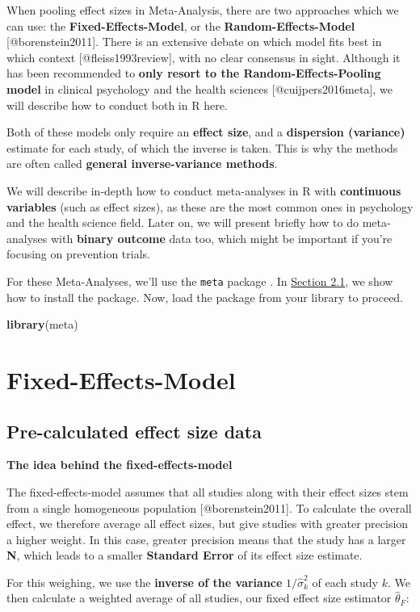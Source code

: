 \documentclass[]{book}
\newenvironment{Shaded}{\begin{snugshade}}{\end{snugshade}}
\newcommand{\KeywordTok}[1]{\textcolor[rgb]{0.13,0.29,0.53}{\textbf{#1}}}
\newcommand{\NormalTok}[1]{#1}
\theoremstyle{definition}
\theoremstyle{definition}
\theoremstyle{definition}
\theoremstyle{remark}
\begin{document}
\begin{rmdinfo}
When pooling effect sizes in Meta-Analysis, there are two approaches
which we can use: the \textbf{Fixed-Effects-Model}, or the
\textbf{Random-Effects-Model} {[}@borenstein2011{]}. There is an
extensive debate on which model fits best in which context
{[}@fleiss1993review{]}, with no clear consensus in sight. Although it
has been recommended to \textbf{only resort to the
Random-Effects-Pooling model} in clinical psychology and the health
sciences {[}@cuijpers2016meta{]}, we will describe how to conduct both
in R here.

Both of these models only require an \textbf{effect size}, and a
\textbf{dispersion (variance)} estimate for each study, of which the
inverse is taken. This is why the methods are often called
\textbf{general inverse-variance methods}.
\end{rmdinfo}

We will describe in-depth how to conduct meta-analyses in R with
\textbf{continuous variables} (such as effect sizes), as these are the
most common ones in psychology and the health science field. Later on,
we will present briefly how to do meta-analyses with \textbf{binary
outcome} data too, which might be important if you're focusing on
prevention trials.

For these Meta-Analyses, we'll use the \texttt{meta} package
\citep{schwarzer2007meta}. In \protect\hyperlink{RStudio}{Section 2.1},
we show how to install the package. Now, load the package from your
library to proceed.

\begin{Shaded}
\begin{Highlighting}[]
\KeywordTok{library}\NormalTok{(meta)}
\end{Highlighting}
\end{Shaded}

\hypertarget{fixed}{\section{Fixed-Effects-Model}\label{fixed}}

\subsection{Pre-calculated effect size
data}\label{pre-calculated-effect-size-data}

\begin{rmdinfo}
\textbf{The idea behind the fixed-effects-model}

The fixed-effects-model assumes that all studies along with their effect
sizes stem from a single homogeneous population {[}@borenstein2011{]}.
To calculate the overall effect, we therefore average all effect sizes,
but give studies with greater precision a higher weight. In this case,
greater precision means that the study has a larger \textbf{N}, which
leads to a smaller \textbf{Standard Error} of its effect size estimate.

For this weighing, we use the \textbf{inverse of the variance}
\(1/\hat\sigma^2_k\) of each study \(k\). We then calculate a weighted
average of all studies, our fixed effect size estimator
\(\hat\theta_F\):
\end{rmdinfo}
\end{document}
